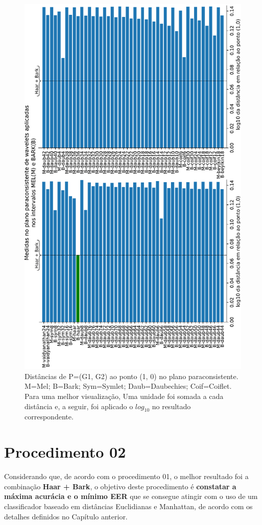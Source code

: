 	\newpage
	\begin{landscape}
		\begin{figure}[h]
			\centering
			\includegraphics[width=0.6\linewidth,angle=-90]{images/results/paraconsistentPlane/ParaconsistentFull.pdf}
			\caption{Distâncias de P=(G1, G2) ao ponto (1, 0) no plano paraconsistente. M=Mel; B=Bark; Sym=Symlet; Daub=Daubechies; Coif=Coiflet. Para uma melhor visualização, Uma unidade foi somada a cada distância e, a seguir, foi aplicado o $log_{10}$ no resultado correspondente.}
			\label{fig:paraconsistentfull}
		\end{figure}
	\end{landscape}
	\newpage
	
	\FloatBarrier
	
	
	\disableClearpage
	
	\section{Procedimento 02} \label{chap:testsResults:sec:Experimento02}
		\enableClearpage
	
		\par Considerando que, de acordo com o procedimento 01, o melhor resultado foi a combinação \textbf{Haar + Bark}, o objetivo deste procedimento é \textbf{constatar a máxima acurácia e o mínimo EER} que se consegue atingir com o uso de um classificador baseado em distâncias Euclidianas e Manhattan, de acordo com os detalhes definidos no Capítulo anterior.
		
